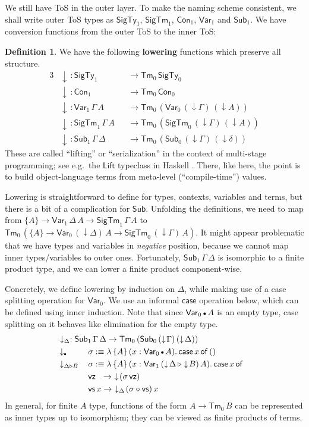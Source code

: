 \documentclass[12pt,a4paper,twoside,openany]{book}
\theoremstyle{remark}
\theoremstyle{definition}
\newtheorem{mydefinition}{Definition}
\theoremstyle{theorem}
\newcommand{\ms}[1]{\mathsf{#1}}
\newcommand{\Con}{\mathsf{Con}}
\newcommand{\Sub}{\mathsf{Sub}}
\newcommand{\Tm}{\mathsf{Tm}}
\newcommand{\ext}{\triangleright}
\newcommand{\emptycon}{\scaleobj{.75}\bullet}
\newcommand{\SigTy}{\mathsf{SigTy}}
\newcommand{\SigTm}{\mathsf{SigTm}}
\newcommand{\Var}{\ms{Var}}
\newcommand{\vz}{\ms{vz}}
\newcommand{\vs}{\ms{vs}}
\newcommand{\down}{\downarrow}
\newcommand{\defn}{:\equiv}
\begin{document}
We still have ToS in the outer layer. To make the naming
scheme consistent, we shall write outer ToS types as $\SigTy_1$,
$\SigTm_1$, $\Con_1$, $\Var_1$ and $\Sub_1$. We have conversion functions from
the outer ToS to the inner ToS:
\begin{mydefinition}
\label{def:simple-lowering}
We have the following \textbf{lowering} functions which
preserve all structure.
\begin{alignat*}{3}
  & \down\,: \SigTy_1 &&\to \Tm_0\,\SigTy_0\\
  & \down\,: \Con_1 &&\to \Tm_0\,\Con_0\\
  & \down\,: \Var_1\,\Gamma\,A &&\to \Tm_0\,(\Var_0\,(\down\!\Gamma)\,(\down\!A))\\
  & \down\,: \SigTm_1\,\Gamma\,A &&\to \Tm_0\,(\SigTm_0\,(\down\!\Gamma)\,(\down\!A))\\
  & \down\,: \Sub_1\,\Gamma\,\Delta &&\to \Tm_0\,(\Sub_0\,(\down\!\Gamma)\,(\down\!\delta))
\end{alignat*}
These are called ``lifting'' or ``serialization'' in the context of
multi-stage programming; see e.g.\ the $\ms{Lift}$ typeclass in Haskell
\cite{pickering-multistage}. There, like here, the point is to build
object-language terms from meta-level (``compile-time'') values.

Lowering is straightforward to define for types, contexts, variables and terms,
but there is a bit of a complication for $\Sub$. Unfolding the definitions, we
need to map from $\{A\} \to \Var_1\,\Delta\,A \to \SigTm_1\,\Gamma\,A$ to
$\Tm_0\,(\{A\} \to \Var_0\,(\down\Delta)\,A \to \SigTm_0\,(\down\Gamma)\,A)$. It
might appear problematic that we have types and variables in \emph{negative}
position, because we cannot map inner types/variables to outer ones.
Fortunately, $\Sub_1\,\Gamma\,\Delta$ is isomorphic to a finite product type,
and we can lower a finite product component-wise.

Concretely, we define lowering by induction on $\Delta$, while making use of
a case splitting operation for $\Var_0$. We use an informal $\ms{case}$
operation below, which can be defined using inner induction. Note that since
$\Var_0\,\emptycon\,A$ is an empty type, case splitting on it behaves like
elimination for the empty type.
\begin{alignat*}{3}
  &\rlap{$\hspace{0.3em}\down_{\Delta} : \Sub_1\,\Gamma\,\Delta \to \Tm_0\,(\Sub_0\,(\down\!\Gamma)\,(\down\!\Delta))$}\\
  &\down_{\emptycon}\,&&\sigma \defn
      \lambda\,\{A\}\,(x : \Var_0\,\emptycon\,A).\,\ms{case}\,x\,\ms{of}\,()\\
  &\down_{\Delta\ext B}\,&&\sigma \defn
      \lambda\,\{A\}\,(x : \Var_1\,(\down\!\Delta\,\ext \down\!B)\,A).\,\ms{case}\,x\,\ms{of}\\
  & &&\vz\hspace{0.65em}\to\,\,\down\!(\sigma\,\vz)\\
  & &&\vs\,x \to\,\,\down_{\Delta}\!(\sigma \circ \vs)\,x
\end{alignat*}
In general, for finite $A$ type, functions of the form $A \to \Tm_0\,B$ can be
represented as inner types up to isomorphism; they can be viewed as finite
products of terms.


\end{mydefinition}
\end{document}
